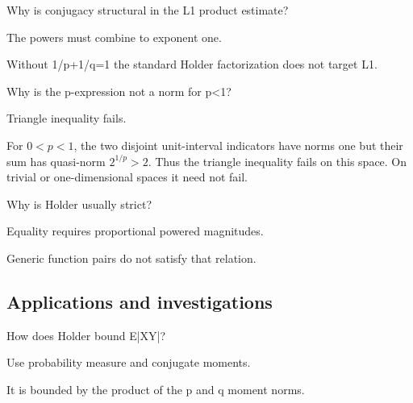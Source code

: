 \begin{exercise}\label{exr:iii07-expand-10}
Why is conjugacy structural in the L1 product estimate?
\end{exercise}
\begin{hint}
The powers must combine to exponent one.
\end{hint}
\begin{solution}
Without 1/p+1/q=1 the standard Holder factorization does not target L1.
\end{solution}

\begin{exercise}\label{exr:iii07-expand-11}
Why is the p-expression not a norm for p<1?
\end{exercise}
\begin{hint}
Triangle inequality fails.
\end{hint}
\begin{solution}
For $0<p<1$, the two disjoint unit-interval indicators have norms one but their sum has quasi-norm $2^{1/p}>2$. Thus the triangle inequality fails on this space. On trivial or one-dimensional spaces it need not fail.
\end{solution}

\begin{exercise}\label{exr:iii07-expand-12}
Why is Holder usually strict?
\end{exercise}
\begin{hint}
Equality requires proportional powered magnitudes.
\end{hint}
\begin{solution}
Generic function pairs do not satisfy that relation.
\end{solution}

\subsection*{Applications and investigations}

\begin{exercise}[Moments]\label{exr:iii07-expand-13}
How does Holder bound E|XY|?
\end{exercise}
\begin{hint}
Use probability measure and conjugate moments.
\end{hint}
\begin{solution}
It is bounded by the product of the p and q moment norms.
\end{solution}

